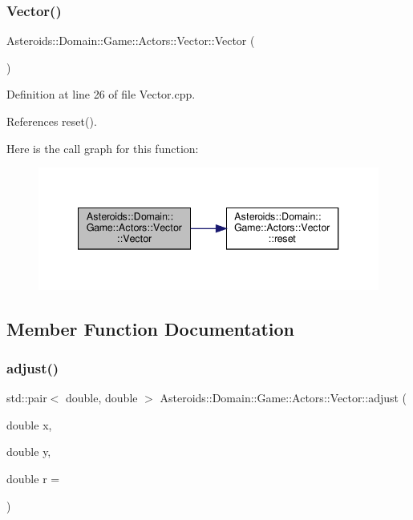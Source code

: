 \subsubsection{\texorpdfstring{Vector()}{Vector()}}
{\footnotesize\ttfamily Asteroids\+::\+Domain\+::\+Game\+::\+Actors\+::\+Vector\+::\+Vector (\begin{DoxyParamCaption}{ }\end{DoxyParamCaption})}



Definition at line 26 of file Vector.\+cpp.



References reset().

Here is the call graph for this function\+:\nopagebreak
\begin{figure}[H]
\begin{center}
\leavevmode
\includegraphics[width=340pt]{classAsteroids_1_1Domain_1_1Game_1_1Actors_1_1Vector_a1ae45243cda745174556aaed9cb2bdab_cgraph}
\end{center}
\end{figure}


\subsection{Member Function Documentation}
\mbox{\label{classAsteroids_1_1Domain_1_1Game_1_1Actors_1_1Vector_a271d706f78f5f1ff2df2a5126298f9d1}} 
\subsubsection{\texorpdfstring{adjust()}{adjust()}}
{\footnotesize\ttfamily std\+::pair$<$ double, double $>$ Asteroids\+::\+Domain\+::\+Game\+::\+Actors\+::\+Vector\+::adjust (\begin{DoxyParamCaption}\item[{double}]{x,  }\item[{double}]{y,  }\item[{double}]{r = {} }\end{DoxyParamCaption})}




